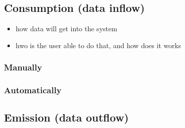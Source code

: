 \documentclass[12pt,english,a4paper,titlepage,cleardoublepage=empty,dottedtoc]{report}
\providecommand{\tightlist}{%
  \setlength{\itemsep}{0pt}\setlength{\parskip}{0pt}}
\begin{document}
\subsection{Consumption (data inflow)}\label{consumption-data-inflow}

\begin{itemize}
\tightlist
\item
  how data will get into the system
\item
  hwo is the user able to do that, and how does it works
\end{itemize}

\subsubsection{Manually}\label{manually}

\subsubsection{Automatically}\label{automatically}

\subsection{Emission (data outflow)}\label{emission-data-outflow}
\end{document}
